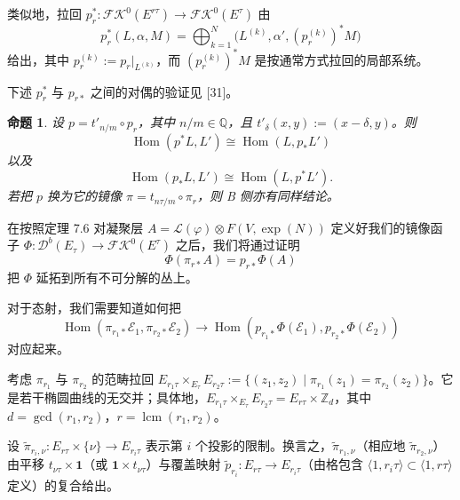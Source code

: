\documentclass[11pt,a4paper]{article}
\theoremstyle{plain}
\newtheorem{proposition}[theorem]{命题}
\theoremstyle{definition}
\begin{document}
类似地，拉回 $p_r^*:\mathcal{FK}^0(E^{r\tau})\to\mathcal{FK}^0(E^\tau)$ 由
\[
p_r^{*}(L,\alpha,M)=\bigoplus_{k=1}^{N}\bigl(L^{(k)},\alpha',(p_r^{(k)})^{*}M\bigr)
\]
给出，其中 $p_r^{(k)}:=p_r|_{L^{(k)}}$，而 $(p_r^{(k)})^*M$ 是按通常方式拉回的局部系统。

下述 $p_r^*$ 与 $p_{r*}$ 之间的对偶的验证见 [31]。

\begin{proposition}
设 $p=t'_{n/m}\circ p_r$，其中 $n/m\in\mathbb{Q}$，且 $t'_\delta(x,y):=(x-\delta,y)$。则
\[
\operatorname{Hom}(p^{*}L,L')\cong\operatorname{Hom}(L,p_{*}L')
\]
以及
\[
\operatorname{Hom}(p_{*}L,L')\cong\operatorname{Hom}(L,p^{*}L').
\]
若把 $p$ 换为它的镜像 $\pi=t_{n\tau/m}\circ\pi_r$，则 B 侧亦有同样结论。
\end{proposition}

在按照定理 7.6 对凝聚层 $A=\mathcal{L}(\varphi)\otimes F(V,\exp(N))$ 定义好我们的镜像函子 $\Phi:\mathcal{D}^b(E_\tau)\to\mathcal{FK}^0(E^\tau)$ 之后，我们将通过证明
\[
\Phi(\pi_{r*}A)=p_{r*}\Phi(A)
\]
把 $\Phi$ 延拓到所有不可分解的丛上。

对于态射，我们需要知道如何把
\[
\operatorname{Hom}(\pi_{r_1*}\mathcal{E}_1,\pi_{r_2*}\mathcal{E}_2)\to\operatorname{Hom}(p_{r_1*}\Phi(\mathcal{E}_1),p_{r_2*}\Phi(\mathcal{E}_2))
\]
对应起来。

考虑 $\pi_{r_1}$ 与 $\pi_{r_2}$ 的范畴拉回 $E_{r_1\tau}\times_{E_\tau}E_{r_2\tau}:=\{(z_1,z_2)\mid\pi_{r_1}(z_1)=\pi_{r_2}(z_2)\}$。它是若干椭圆曲线的无交并；具体地，$E_{r_1\tau}\times_{E_\tau}E_{r_2\tau}=E_{r\tau}\times\mathbb{Z}_d$，其中 $d=\gcd(r_1,r_2)$，$r=\operatorname{lcm}(r_1,r_2)$。


设 $\tilde{\pi}_{r_i,\nu}:E_{r\tau}\times\{\nu\}\to E_{r_i\tau}$ 表示第 $i$ 个投影的限制。换言之，$\tilde{\pi}_{r_1,\nu}$（相应地 $\tilde{\pi}_{r_2,\nu}$）由平移 $t_{\nu\tau}\times\mathbf{1}$（或 $\mathbf{1}\times t_{\nu\tau}$）与覆盖映射 $\tilde{p}_{r_i}:E_{r\tau}\to E_{r_i\tau}$（由格包含 $\langle 1,r_i\tau\rangle\subset\langle 1,r\tau\rangle$ 定义）的复合给出。
\end{document}
